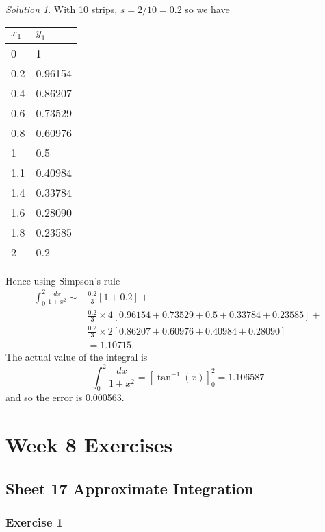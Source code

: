 \documentclass[
  11pt,
  oneside]{book}
\newcommand{\slide}{}
\theoremstyle{definition}
\theoremstyle{definition}
\theoremstyle{definition}
\theoremstyle{definition}
\theoremstyle{remark}
\newtheorem*{solution}{Solution}
\begin{document}
\begin{solution}
With 10 strips, \(s=2/10=0.2\) so we have

\begin{tabular}{l|l}
\hline
$x_1$ & $y_1$\\
\hline
0 & 1\\
\hline
0.2 & 0.96154\\
\hline
0.4 & 0.86207\\
\hline
0.6 & 0.73529\\
\hline
0.8 & 0.60976\\
\hline
1 & 0.5\\
\hline
1.1 & 0.40984\\
\hline
1.4 & 0.33784\\
\hline
1.6 & 0.28090\\
\hline
1.8 & 0.23585\\
\hline
2 & 0.2\\
\hline
\end{tabular}

Hence using Simpson's rule
\begin{align*}
\int_0^2\frac{dx}{1+x^2} \sim& \frac{0.2}3\left[1 + 0.2\right] +\\
&\frac{0.2}3\times 4\left[0.96154+0.73529+0.5+0.33784+0.23585\right]+\\
&\frac{0.2}3\times 2\left[0.86207+0.60976+0.40984+0.28090\right]\\
&= 1.10715.
\end{align*}
The actual value of the integral is
\[
\int_0^2\frac{dx}{1+x^2} = \left[\tan^{-1}(x)\right]_0^2 = 1.106587
\]
and so the error is 0.000563.
\end{solution}

\chapter*{Week 8 Exercises}\label{week-8-exercises}

\section{Sheet 17 Approximate Integration}\label{sheet-17-approximate-integration}

\slide

\subsection*{Exercise 1}\label{exercise-1-7}
\end{document}

